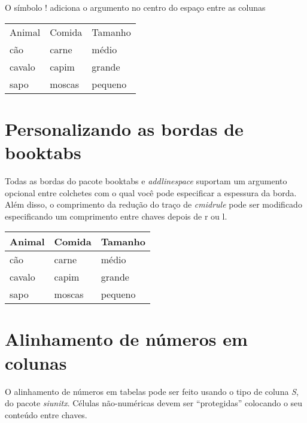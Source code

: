 \documentclass[brazilian, 12pt]{article}
\begin{document}
\vspace{10pt}

O símbolo ! adiciona o argumento no centro do espaço entre as colunas \\

\begin{tabular}{l!{:} l l}
    Animal & Comida & Tamanho \\
    cão    & carne  & médio   \\
    cavalo & capim  & grande  \\
    sapo   & moscas & pequeno \\
\end{tabular}

\vspace{10pt}

\section{Personalizando as bordas de booktabs}

Todas as bordas do pacote booktabs e \emph{addlinespace} suportam um argumento opcional entre colchetes com o qual você pode especificar a espessura da borda. Além disso, o comprimento da redução do traço de \emph{cmidrule} pode ser modificado especificando um comprimento entre chaves depois de r ou l. \\

\begin{tabular}{@{} lll@{}}
    \toprule[2pt]
    Animal & Comida & Tamanho \\
    \midrule[1pt]
    cão    & carne  & médio   \\
    \cmidrule[0.5pt](r{1pt}l{1cm}){1-2}
    cavalo & capim  & grande  \\
    sapo   & moscas & pequeno \\ 
    \bottomrule[2pt]
\end{tabular}

\vspace{10pt}

\section{Alinhamento de números em colunas}

O alinhamento de números em tabelas pode ser feito usando o tipo de coluna \emph{S}, do pacote \emph{siunitx}. Células não-numéricas devem ser “protegidas” colocando o seu conteúdo entre chaves. \\
\end{document}
